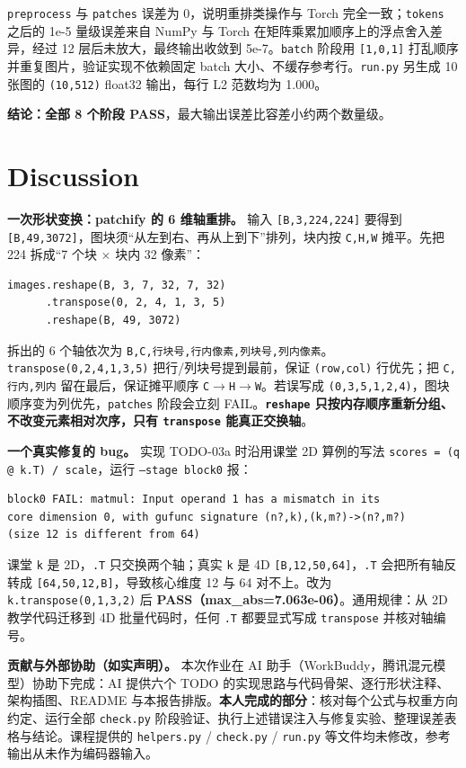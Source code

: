 \documentclass[a4paper,12pt]{article}
\newcommand{\hl}[1]{\textcolor{red!85!black}{\textbf{#1}}}
\newcommand{\code}[1]{\texttt{\small #1}}
\begin{document}
\code{preprocess} 与 \code{patches} 误差为 0，说明重排类操作与 Torch 完全一致；\code{tokens} 之后的 1e-5 量级误差来自 NumPy 与 Torch 在矩阵乘累加顺序上的浮点舍入差异，经过 12 层后未放大，最终输出收敛到 5e-7。\code{batch} 阶段用 \code{[1,0,1]} 打乱顺序并重复图片，验证实现不依赖固定 batch 大小、不缓存参考行。\code{run.py} 另生成 10 张图的 \code{(10,512)} float32 输出，每行 L2 范数均为 1.000。

\noindent\hl{结论：全部 8 个阶段 PASS}，最大输出误差比容差小约两个数量级。

\section{Discussion}

\textbf{一次形状变换：patchify 的 6 维轴重排。} 输入 \code{[B,3,224,224]} 要得到 \code{[B,49,3072]}，图块须``从左到右、再从上到下''排列，块内按 \code{C,H,W} 摊平。先把 224 拆成``7 个块 $\times$ 块内 32 像素''：
\begin{verbatim}
images.reshape(B, 3, 7, 32, 7, 32)
      .transpose(0, 2, 4, 1, 3, 5)
      .reshape(B, 49, 3072)
\end{verbatim}
拆出的 6 个轴依次为 \code{B,C,行块号,行内像素,列块号,列内像素}。
\code{transpose(0,2,4,1,3,5)} 把行/列块号提到最前，保证 \code{(row,col)} 行优先；把 \code{C,行内,列内} 留在最后，保证摊平顺序 \code{C$\to$H$\to$W}。若误写成 \code{(0,3,5,1,2,4)}，图块顺序变为列优先，\code{patches} 阶段会立刻 FAIL。\hl{\code{reshape} 只按内存顺序重新分组、不改变元素相对次序，只有 \code{transpose} 能真正交换轴}。

\textbf{一个真实修复的 bug。} 实现 TODO-03a 时沿用课堂 2D 算例的写法 \code{scores = (q @ k.T) / scale}，运行 \code{--stage block0} 报：
\begin{verbatim}
block0 FAIL: matmul: Input operand 1 has a mismatch in its
core dimension 0, with gufunc signature (n?,k),(k,m?)->(n?,m?)
(size 12 is different from 64)
\end{verbatim}
课堂 \code{k} 是 2D，\code{.T} 只交换两个轴；真实 \code{k} 是 4D \code{[B,12,50,64]}，\code{.T} 会把所有轴反转成 \code{[64,50,12,B]}，导致核心维度 12 与 64 对不上。改为 \code{k.transpose(0,1,3,2)} 后 \hl{PASS（max\_abs=7.063e-06）}。通用规律：从 2D 教学代码迁移到 4D 批量代码时，任何 \code{.T} 都要显式写成 \code{transpose} 并核对轴编号。

\textbf{贡献与外部协助（如实声明）。} 本次作业在 AI 助手（WorkBuddy，腾讯混元模型）协助下完成：AI 提供六个 TODO 的实现思路与代码骨架、逐行形状注释、架构插图、README 与本报告排版。\hl{本人完成的部分}：核对每个公式与权重方向约定、运行全部 \code{check.py} 阶段验证、执行上述错误注入与修复实验、整理误差表格与结论。课程提供的 \code{helpers.py} / \code{check.py} / \code{run.py} 等文件均未修改，参考输出从未作为编码器输入。
\end{document}
